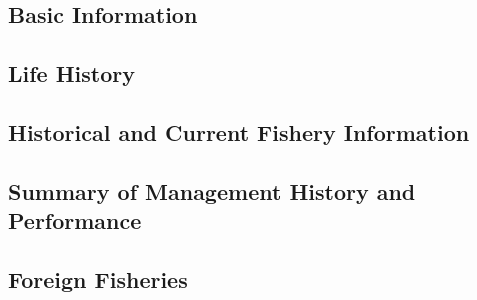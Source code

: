 \documentclass[11pt,
  english,
  a4paper,
]{article}
\begin{document}
\hypertarget{basic-information-2}{%
\subsection{Basic Information}\label{basic-information-2}}

\leavevmode\tagmcend\tagstructend


\hypertarget{life-history}{%
\subsection{Life History}\label{life-history}}

\leavevmode\tagmcend\tagstructend


\hypertarget{historical-and-current-fishery-information-2}{%
\subsection{Historical and Current Fishery Information}\label{historical-and-current-fishery-information-2}}

\leavevmode\tagmcend\tagstructend


\hypertarget{summary-of-management-history-and-performance-2}{%
\subsection{Summary of Management History and Performance}\label{summary-of-management-history-and-performance-2}}

\leavevmode\tagmcend\tagstructend


\hypertarget{foreign-fisheries-2}{%
\subsection{Foreign Fisheries}\label{foreign-fisheries-2}}

\leavevmode\tagmcend\tagstructend
\end{document}
